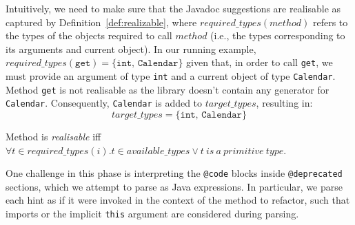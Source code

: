 \documentclass[sigconf,review,anonymous]{acmart}
\begin{document}
Intuitively, we need to make sure that the Javadoc suggestions
are realisable as captured by Definition~\ref{def:realizable}, where 
$required\_types(method)$ refers to the types of the objects required to call $method$ (i.e., the types corresponding to its arguments and current object).
In our running example, $required\_types(\texttt{get}) = \{\texttt{int, Calendar}\}$
given that, in order to call \texttt{get}, we must provide an argument of type \texttt{int} and a current object of type \texttt{Calendar}.
Method \texttt{get} is not realisable as the library doesn't contain any generator for \texttt{Calendar}.
Consequently, \texttt{Calendar} is added to $target\_types$, resulting in:
$$target\_types = \{\texttt{int, Calendar}\}$$

\begin{definition}\label{def:realizable}
Method  is {\em realisable} iff $\forall t \in required\_types(i). t \in available\_types \vee t~is~a~primitive~type$.
\end{definition}



One challenge in this phase is interpreting the
\texttt{@code} blocks inside \texttt{@deprecated} sections, which 
we attempt to parse as Java expressions. In particular, we parse each hint as if it were invoked in the context of
the method to refactor, such that imports or the implicit \texttt{this} argument
are considered during parsing.
\end{document}
